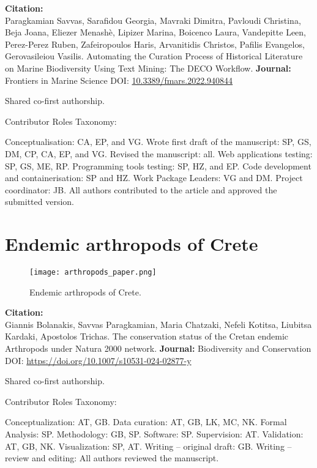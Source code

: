 \textbf{Citation:} \\ 
Paragkamian Savvas, Sarafidou Georgia, Mavraki Dimitra, Pavloudi Christina,
Beja Joana, Eliezer Menashè, Lipizer Marina, Boicenco Laura, Vandepitte Leen,
Perez-Perez Ruben, Zafeiropoulos Haris, Arvanitidis Christos, Pafilis Evangelos, Gerovasileiou Vasilis.
Automating the Curation Process of Historical Literature on Marine Biodiversity Using Text Mining: The DECO Workflow.
\textbf{Journal:} Frontiers in Marine Science
DOI: \href{https://www.frontiersin.org/articles/10.3389/fmars.2022.940844}{10.3389/fmars.2022.940844}

Shared co-first authorship.

Contributor Roles Taxonomy:

Conceptualisation: CA, EP, and VG.
Wrote first draft of the manuscript: SP, GS, DM, CP, CA, EP, and VG.
Revised the manuscript: all.
Web applications testing: SP, GS, ME, RP.
Programming tools testing: SP, HZ, and EP.
Code development and containerisation: SP and HZ.
Work Package Leaders: VG and DM.
Project coordinator: JB.
All authors contributed to the article and approved the submitted version.

\section{Endemic arthropods of Crete}

\begin{figure}[hbt!] 
    \centering\texttt{[image: arthropods\_paper.png]}
\caption{Endemic arthropods of Crete.}
    \label{fig:deco_paper}
\end{figure}

\textbf{Citation:} \\ 
Giannis Bolanakis, Savvas Paragkamian, Maria Chatzaki, Nefeli Kotitsa, Liubitsa Kardaki, Apostolos Trichas.
The conservation status of the Cretan endemic Arthropods under Natura 2000 network.
\textbf{Journal:} Biodiversity and Conservation 
DOI: \href{https://link.springer.com/article/10.1007/s10531-024-02877-y}{https://doi.org/10.1007/s10531-024-02877-y}

Shared co-first authorship.

Contributor Roles Taxonomy:

Conceptualization: AT, GB.
Data curation: AT, GB, LK, MC, NK.
Formal Analysis: SP.
Methodology: GB, SP.
Software: SP.
Supervision: AT.
Validation: AT, GB, NK.
Visualization: SP, AT.
Writing – original draft: GB.
Writing – review and editing: All authors reviewed the manuscript.

